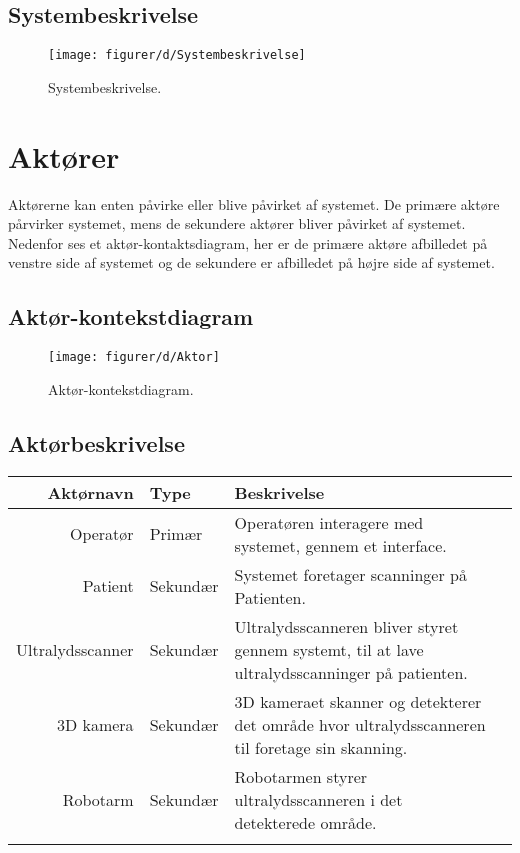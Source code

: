 \subsection{Systembeskrivelse}
\begin{figure}[H]
    \centering
    \texttt{[image: figurer/d/Systembeskrivelse]}
    \caption{Systembeskrivelse.}
    \label{Systembeskrivelse}
\end{figure}

\section{Aktører}
Aktørerne kan enten påvirke eller blive påvirket af systemet. De primære aktøre pårvirker systemet, mens de sekundere aktører bliver påvirket af systemet. Nedenfor ses et aktør-kontaktsdiagram, her er de primære aktøre afbilledet på venstre side af systemet og de sekundere er afbilledet på højre side af systemet. 

\subsection{Aktør-kontekstdiagram}
\begin{figure}[H]
    \centering
    \texttt{[image: figurer/d/Aktor]}
    \caption{Aktør-kontekstdiagram.}
    \label{akDiagram}
\end{figure}

\subsection{Aktørbeskrivelse}
\begin{longtabu} to 
    Aktørnavn &  Type &  Beskrivelse\\[-1ex]
    \midrule
   Operatør &  Primær &   Operatøren interagere med systemet, gennem et interface. \\
    Patient &  Sekundær &    Systemet foretager scanninger på Patienten. \\
   Ultralydsscanner & Sekundær &    Ultralydsscanneren bliver styret gennem systemt, til at lave ultralydsscanninger på patienten.\\
   3D kamera &  Sekundær &    3D kameraet skanner og detekterer det område hvor ultralydsscanneren til foretage sin skanning. \\
    Robotarm &   Sekundær &    Robotarmen styrer ultralydsscanneren i det detekterede område.\\
\label{actortable}
\end{longtabu}


